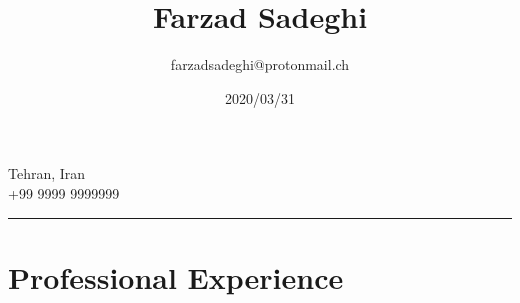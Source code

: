 \documentclass[10pt]{article}
\title{\bfseries\Huge Farzad Sadeghi}
\author{farzadsadeghi@protonmail.ch}
\date{2020/03/31}
\begin{document}
\maketitle
\begin{center}
  \begin{minipage}[ht]{0.2\textwidth}{\centering}
  \vspace*{\fill}
  \centering
  Tehran, Iran\\
  +99 9999 9999999
  \centering
  \vspace*{\fill}
  \end{minipage}
\end{center}

\vspace{5mm}
\hrule
\vspace{5mm}

\section*{Professional Experience}
\end{document}
